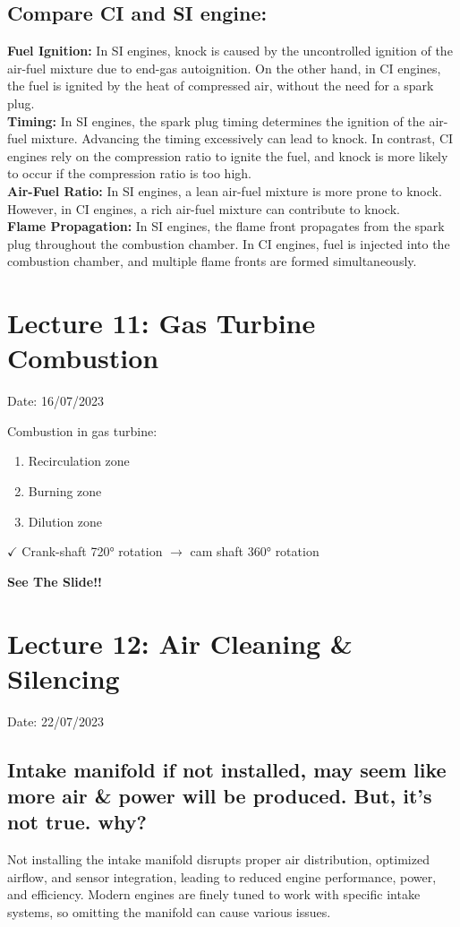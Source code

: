 \documentclass{article}
\begin{document}
\subsection*{Compare CI and SI engine:}
\textbf{Fuel Ignition:} In SI engines, knock is caused by the uncontrolled ignition of the air-fuel mixture due to end-gas autoignition. On the other hand, in CI engines, the fuel is ignited by the heat of compressed air, without the need for a spark plug.\\

\textbf{Timing:} In SI engines, the spark plug timing determines the ignition of the air-fuel mixture. Advancing the timing excessively can lead to knock. In contrast, CI engines rely on the compression ratio to ignite the fuel, and knock is more likely to occur if the compression ratio is too high.\\

\textbf{Air-Fuel Ratio:} In SI engines, a lean air-fuel mixture is more prone to knock. However, in CI engines, a rich air-fuel mixture can contribute to knock.\\

\textbf{Flame Propagation:} In SI engines, the flame front propagates from the spark plug throughout the combustion chamber. In CI engines, fuel is injected into the combustion chamber, and multiple flame fronts are formed simultaneously.\\ 

\section{Lecture 11: Gas Turbine Combustion} 
\hfill Date: 16/07/2023

Combustion in gas turbine: 
\begin{enumerate}
  \item Recirculation zone 
  \item Burning zone
  \item Dilution zone 
\end{enumerate}

$\checkmark $ Crank-shaft 720° rotation $\rightarrow$ cam shaft 360° rotation  

\textbf{See The Slide!!}

\section{Lecture 12: Air Cleaning \& Silencing} 
\hfill Date: 22/07/2023


\subsection*{Intake manifold if not installed, may seem like more air \& power will be produced. But, it's not true. why?}
Not installing the intake manifold disrupts proper air distribution, optimized airflow, and sensor integration, leading to reduced engine performance, power, and efficiency. Modern engines are finely tuned to work with specific intake systems, so omitting the manifold can cause various issues.
\end{document}

